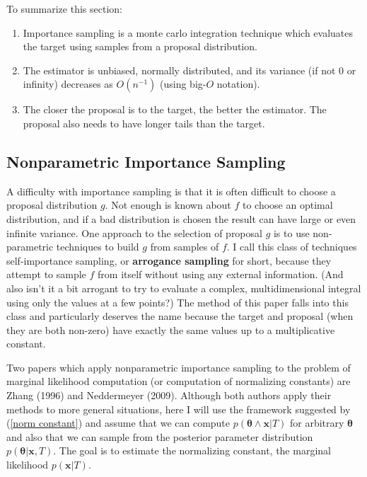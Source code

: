 \documentclass[letterpaper,12pt]{article}
\newcommand{\bx}{\boldsymbol x}
\newcommand{\btheta}{\boldsymbol \theta}
\begin{document}
To summarize this section:

\begin{enumerate}
  \item Importance sampling is a monte carlo integration technique
    which evaluates the target using samples from a proposal
    distribution.
  \item The estimator is unbiased, normally distributed, and its
    variance (if not 0 or infinity) decreases as $O(n^{-1})$ (using
    big-$O$ notation).
  \item The closer the proposal is to the target, the better the
    estimator.  The proposal also needs to have longer tails than the
    target.
\end{enumerate}

\subsection{Nonparametric Importance Sampling}

A difficulty with importance sampling is that it is often difficult to
choose a proposal distribution $g$.  Not enough is known about $f$ to
choose an optimal distribution, and if a bad distribution is chosen
the result can have large or even infinite variance.  One approach to
the selection of proposal $g$ is to use non-parametric techniques to
build $g$ from samples of $f$.  I call this class of techniques
self-importance sampling, or \textbf{arrogance sampling} for short,
because they attempt to sample $f$ from itself without using any
external information.  (And also isn't it a bit arrogant to try to
evaluate a complex, multidimensional integral using only the values at
a few points?)  The method of this paper falls into this class and
particularly deserves the name because the target and proposal (when
they are both non-zero) have exactly the same values up to a
multiplicative constant.

Two papers which apply nonparametric importance sampling to the
problem of marginal likelihood computation (or computation of
normalizing constants) are Zhang (1996) and Neddermeyer (2009).
Although both authors apply their methods to more general situations,
here I will use the framework suggested by (\ref{norm constant}) and
assume that we can compute $p(\btheta \wedge \bx|T)$ for arbitrary
$\btheta$ and also that we can sample from the posterior parameter
distribution $p(\btheta|\bx, T)$.  The goal is to estimate the
normalizing constant, the marginal likelihood $p(\bx|T)$.
\end{document}
